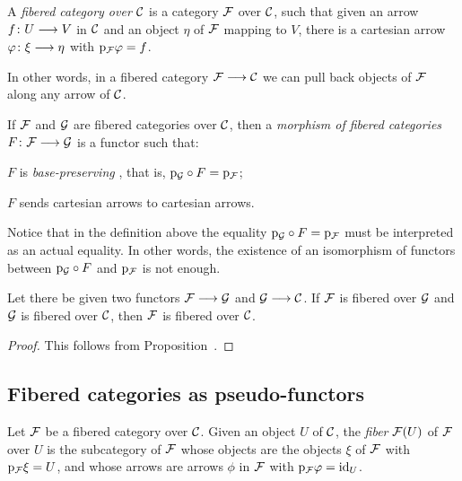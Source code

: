 \begin{3   FIBERED CATEGORIES}
\begin{3.1 Fibered categories}
\begin{definition} A \emph{fibered category over $\mathcal{C}$}%
%
 is a category $\mathcal{F}$ over $\mathcal{C}$, such that given an arrow $f \colon U \arr V$ in $\mathcal{C}$ and an object $\eta$ of $\mathcal{F}$ mapping to $V$, there is a cartesian arrow $\phi\colon \xi \arr \eta$ with $\mathrm{p}_{\mathcal{F}} \varphi = f$.
\end{definition}

In other words, in a fibered category $\cF \arr \cC$  we can pull back objects of $\mathcal{F}$ along any arrow of $\mathcal{C}$.

\begin{definition}
If $\mathcal{F}$ and $\mathcal{G}$ are fibered categories over $\mathcal{C}$, then a \emph{morphism of fibered categories}%
%
 $F \colon \cF \arr \cG$ is a functor such that:

\begin{enumeratei}
\item $F$ is \emph{base-preserving}%
%
, that is, $\mathrm{p}_{\mathcal{G}} \circ F = \mathrm{p}_{\mathcal{F}}$; \item $F$ sends cartesian arrows to cartesian arrows.
\end{enumeratei}
\end{definition}

Notice that in the definition above the equality $\mathrm{p}_{\mathcal{G}} \circ F = \mathrm{p}_{\mathcal{F}}$ must be interpreted as an actual equality. In other words, the existence of an isomorphism of functors between $\mathrm{p}_{\mathcal{G}} \circ F$ and $\mathrm{p}_{\mathcal{F}}$ is not enough.
 
\begin{proposition}
Let there be given two functors $\cF \arr \cG$ and $\cG \arr \cC$. If $\mathcal{F}$ is fibered over $\mathcal{G}$ and $\mathcal{G}$ is fibered over $\mathcal{C}$, then $\mathcal{F}$ is fibered over $\mathcal{C}$.
\end{proposition}

\begin{proof}
This follows from Proposition~.
\end{proof}


\subsection{Fibered categories as pseudo-functors}

\begin{definition} Let $\mathcal{F}$ be a fibered category over $\mathcal{C}$. Given an object $U$ of $\mathcal{C}$, the \emph{fiber}%
%
 $\mathcal{F}(U)$ of $\mathcal{F}$ over $U$ is the subcategory of $\mathcal{F}$ whose objects are the objects $\xi$ of $\mathcal{F}$ with $\mathrm{p}_{\mathcal{F}} \xi = U$, and whose arrows are arrows $\phi$ in $\mathcal{F}$ with $\mathrm{p}_{\mathcal{F}} \varphi = \mathrm{id}_U$.
\end{definition}


\end{3.1 Fibered categories}
\end{3   FIBERED CATEGORIES}
